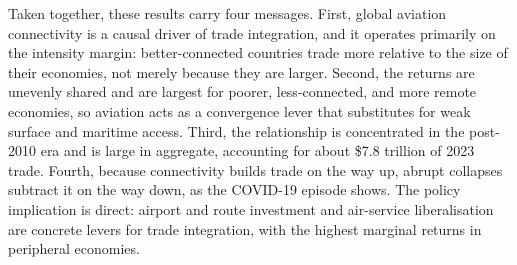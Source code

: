Taken together, these results carry four messages. First, global aviation
connectivity is a causal driver of trade integration, and it operates primarily on
the intensity margin: better-connected countries trade more relative to the size
of their economies, not merely because they are larger. Second, the returns are
unevenly shared and are largest for poorer, less-connected, and more remote
economies, so aviation acts as a convergence lever that substitutes for weak
surface and maritime access. Third, the relationship is concentrated in the
post-2010 era and is large in aggregate, accounting for about \$7.8 trillion of
2023 trade. Fourth, because connectivity builds trade on the way up, abrupt
collapses subtract it on the way down, as the COVID-19 episode shows. The policy
implication is direct: airport and route investment and air-service liberalisation
are concrete levers for trade integration, with the highest marginal returns in
peripheral economies.
